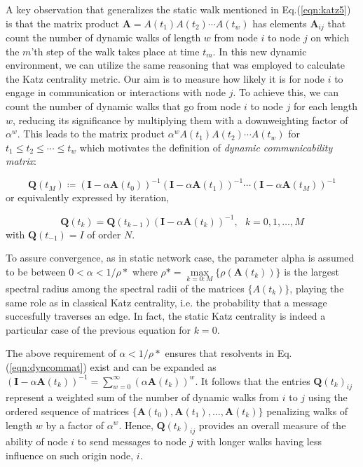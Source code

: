 A key observation that generalizes the static walk mentioned in Eq.(\ref{eqn:katz5}) is that the matrix product $\mathbf{A} = A(t_1)A(t_2)\cdots A(t_w)$ has elements $\mathbf{A}_{ij}$ that count the number of dynamic walks of length $w$ from node $i$ to node $j$ on which the $m$'th step of the walk takes place at time $t_m$. In this new dynamic environment, we can utilize the same reasoning that was employed to calculate the Katz centrality metric. Our aim is to measure how likely it is for node $i$ to engage in communication or interactions with node $j$. To achieve this, we can count the number of dynamic walks that go from node $i$ to node $j$ for each length $w$, reducing its significance by multiplying them with a downweighting factor of $\alpha^w$. This leads to the matrix product $\alpha^wA(t_1)A(t_2)\cdots A(t_w)$ for $t_1\le t_2\le \cdots \le t_w$ which motivates the definition of \textit{dynamic communicability matrix}:

\begin{equation}
\label{eqn:dyncommat}
    \mathbf{Q}(t_M) \coloneqq (\mathbf{I} - \alpha\mathbf{A}(t_0))^{-1} (\mathbf{I} - \alpha\mathbf{A}(t_1))^{-1} \cdots (\mathbf{I} - \alpha\mathbf{A}(t_M))^{-1}
\end{equation}
or equivalently expressed by iteration,

\begin{equation}
\label{eqn:dyncommatiter}
    \mathbf{Q}(t_k) = \mathbf{Q}(t_{k-1})(\mathbf{I} - \alpha\mathbf{A}(t_k))^{-1} , ~~~k=0,1,\dots,M
\end{equation}
with $\mathbf{Q}(t_{-1})=I$ of order $N$.

To assure convergence, as in static network case, the parameter alpha is assumed to be between $0<\alpha<1/\rho*$ where $\rho* = \underset{k=0:M}{\max}\{\rho(\mathbf{A}(t_k))\}$ is the largest spectral radius among the spectral radii of the matrices $\{A(t_k)\}$, playing the same role as in classical Katz centrality, i.e. the probability that a message succesfully traverses an edge. In fact, the static Katz centrality is indeed a particular case of the previous equation for $k=0$.

The above requirement of $\alpha < 1/\rho*$ ensures that resolvents in Eq. (\ref{eqn:dyncommat}) exist and can be expanded as $(\mathbf{I} - \alpha\mathbf{A}(t_k))^{-1} = \sum_{w=0}^{\infty} (\alpha \mathbf{A}(t_k))^w$. It follows that the entries $\mathbf{Q}(t_k)_{ij}$ represent a weighted sum of the number of dynamic walks from $i$ to $j$ using the ordered sequence of matrices $\{\mathbf{A}(t_0),\mathbf{A}(t_1),\dots,\mathbf{A}(t_k)\}$ penalizing walks of length $w$ by a factor of $\alpha^w$. Hence, $\mathbf{Q}(t_k)_{ij}$ provides an overall measure of the ability of node $i$ to send messages to node $j$ with longer walks having less influence on such origin node, $i$.

